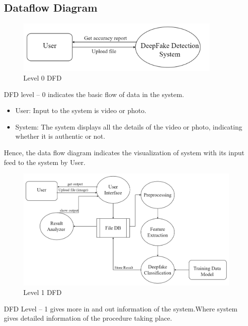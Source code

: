 
\subsection{Dataflow Diagram}
\begin{figure}[h]
    \centering
    \includegraphics[width= 4in ]{img/level0dfd.drawio.png}
    \caption{{Level 0 DFD}}
\end{figure}

\justify
DFD level – 0 indicates the basic flow of data in the system.
\begin{itemize}
    \item User: Input to the system is video or photo.
    \item System: The system displays all the details of the video or photo, indicating whether it is authentic or not.
\end{itemize}
Hence, the data flow diagram indicates the visualization of system with its input feed to the system by User.\\
\begin{figure}[h]
    \centering
    \includegraphics[width= 6in ]{img/level1dfd.drawio.png}
    \caption{{Level 1 DFD}}
\end{figure}
\justify
DFD Level – 1 gives more in and out information of the system.Where system gives detailed information of the procedure taking place.
